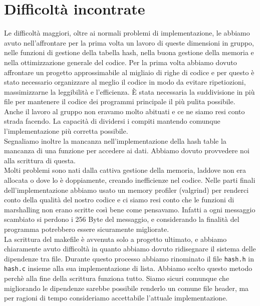 \documentclass[a4paper, 11pt]{article} %
\begin{document}
\section*{Difficoltà incontrate}
Le difficoltà maggiori, oltre ai normali problemi di implementazione, le abbiamo avuto nell'affrontare per la prima volta un lavoro di queste dimensioni in gruppo, nelle funzioni di gestione della tabella hash, nella buona gestione della memoria e nella ottimizzazione generale del codice.
Per la prima volta abbiamo dovuto affrontare un progetto approssimabile al migliaio di righe di codice e per questo è stato necessario organizzare al meglio il codice in modo da evitare ripetiozioni, massimizzarne la leggibilità e l'efficienza. È stata necessaria la suddivisione in più file per mantenere il codice dei programmi principale il più pulita possibile.\\
Anche il lavoro al gruppo non eravamo molto abituati e ce ne siamo resi conto strada facendo. La capacità di dividersi i compiti mantendo comunque l'implementazione più corretta possibile.\\
Segnaliamo inoltre la mancanza nell'implementazione della hash table la mancanza di una funzione per accedere ai dati. Abbiamo dovuto provvedere noi alla scrittura di questa.\\
Molti problemi sono nati dalla cattiva gestione della memoria, laddove non era allocata o dove lo è doppiamente, creando inefficienze nel codice. Nelle parti finali dell'implementazione abbiamo usato un memory profiler (valgrind) per renderci conto della qualità del nostro codice e ci siamo resi conto che le funzioni di marshalling non erano scritte così bene come pensavamo. Infatti a ogni messaggio scambiato si perdono i 256 Byte del messaggio, e considerando la finalità del programma potrebbero essere sicuramente migliorate.\\
La scrittura del makefile è avvenuta solo a progetto ultimato, e abbiamo chiaramente avuto difficoltà in quanto abbiamo dovuto ridisegnare il sistema delle dipendenze tra file. Durante questo processo abbiamo rinominato il file \texttt{hash.h} in \texttt{hash.c} insieme alla sua implementazione di lista. Abbiamo scelto questo metodo perchè alla fine della scrittura funziona tutto. Siamo sicuri comunque che migliorando le dipendenze sarebbe possibile renderlo un comune file header, ma per ragioni di tempo consideriamo accettabile l'attuale implementazione.
\end{document}
